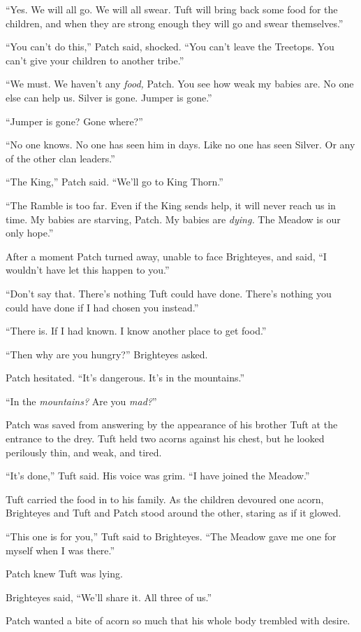 \documentclass[ebook,oneside,openany,17pt]{memoir}
\begin{document}
“Yes. We will all go. We will all swear. Tuft will bring back some
food for the children, and when they are strong enough they will go
and swear themselves.”

“You can’t do this,” Patch said, shocked. “You can’t leave the
Treetops. You can’t give your children to another tribe.”

“We must. We haven’t any \emph{food,} Patch. You see how weak my
babies are. No one else can help us. Silver is gone. Jumper is gone.”

“Jumper is gone? Gone where?”

“No one knows. No one has seen him in days. Like no one has seen
Silver. Or any of the other clan leaders.”

“The King,” Patch said. “We’ll go to King Thorn.”

“The Ramble is too far. Even if the King sends help, it will never
reach us in time. My babies are starving, Patch. My babies are
\emph{dying.} The Meadow is our only hope.”

After a moment Patch turned away, unable to face Brighteyes, and said,
“I wouldn’t have let this happen to you.”

“Don’t say that. There’s nothing Tuft could have done. There’s nothing
you could have done if I had chosen you instead.”

“There is. If I had known. I know another place to get food.”

“Then why are you hungry?” Brighteyes asked.

Patch hesitated. “It’s dangerous. It’s in the mountains.”

“In the \emph{mountains?} Are you \emph{mad?}”

Patch was saved from answering by the appearance of his brother Tuft
at the entrance to the drey. Tuft held two acorns against his chest,
but he looked perilously thin, and weak, and tired.

“It’s done,” Tuft said. His voice was grim. “I have joined the
Meadow.”

Tuft carried the food in to his family. As the children devoured one
acorn, Brighteyes and Tuft and Patch stood around the other, staring
as if it glowed.

“This one is for you,” Tuft said to Brighteyes. “The Meadow gave me
one for myself when I was there.”

Patch knew Tuft was lying.

Brighteyes said, “We’ll share it. All three of us.”

Patch wanted a bite of acorn so much that his whole body trembled with
desire.
\end{document}
